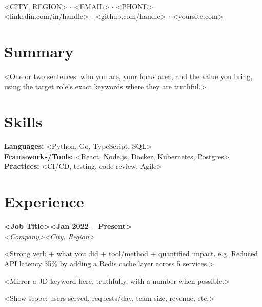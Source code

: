 \documentclass[letterpaper,11pt]{article}
\newcommand{\entry}[4]{%
  \noindent\textbf{#1}\hfill\textbf{#2}\\[1pt]%
  \textit{#3}\hfill\textit{#4}\par\vspace{2pt}%
}
\begin{document}
\begin{center}
  {\huge\bfseries <FULL NAME>}\\[4pt]
  <CITY, REGION> $\cdot$
  \href{mailto:<EMAIL>}{<EMAIL>} $\cdot$
  <PHONE>\\[2pt]
  \href{https://<LINKEDIN URL>}{<linkedin.com/in/handle>} $\cdot$
  \href{https://<GITHUB URL>}{<github.com/handle>} $\cdot$
  \href{https://<PORTFOLIO URL>}{<yoursite.com>}
\end{center}

\section{Summary}
<One or two sentences: who you are, your focus area, and the value you bring,
using the target role's exact keywords where they are truthful.>

\section{Skills}
\textbf{Languages:} <Python, Go, TypeScript, SQL>\\
\textbf{Frameworks/Tools:} <React, Node.js, Docker, Kubernetes, Postgres>\\
\textbf{Practices:} <CI/CD, testing, code review, Agile>

\section{Experience}

\entry{<Job Title>}{<Jan 2022 -- Present>}{<Company>}{<City, Region>}
\begin{bullets}
  \item <Strong verb + what you did + tool/method + quantified impact.
        e.g. Reduced API latency 35\% by adding a Redis cache layer across 5 services.>
  \item <Mirror a JD keyword here, truthfully, with a number when possible.>
  \item <Show scope: users served, requests/day, team size, revenue, etc.>
\end{bullets}
\vspace{4pt}
\end{document}
